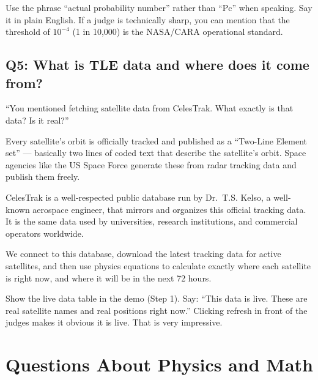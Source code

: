 \documentclass[11pt,a4paper]{article}
\begin{document}
\begin{tipbox}
Use the phrase ``actual probability number'' rather than ``Pc'' when speaking. Say it in plain English. If a judge is technically sharp, you can mention that the threshold of $10^{-4}$ (1 in 10,000) is the NASA/CARA operational standard.
\end{tipbox}

\newpage
\subsection*{Q5: What is TLE data and where does it come from?}

\begin{questionbox}
``You mentioned fetching satellite data from CelesTrak. What exactly is that data? Is it real?''
\end{questionbox}

\begin{answerbox}
Every satellite's orbit is officially tracked and published as a ``Two-Line Element set'' --- basically two lines of coded text that describe the satellite's orbit. Space agencies like the US Space Force generate these from radar tracking data and publish them freely.

CelesTrak is a well-respected public database run by Dr.\ T.S. Kelso, a well-known aerospace engineer, that mirrors and organizes this official tracking data. It is the same data used by universities, research institutions, and commercial operators worldwide.

We connect to this database, download the latest tracking data for active satellites, and then use physics equations to calculate exactly where each satellite is right now, and where it will be in the next 72 hours.
\end{answerbox}

\begin{tipbox}
Show the live data table in the demo (Step 1). Say: ``This data is live. These are real satellite names and real positions right now.'' Clicking refresh in front of the judges makes it obvious it is live. That is very impressive.
\end{tipbox}

\newpage
\section{Questions About Physics and Math}
\end{document}
